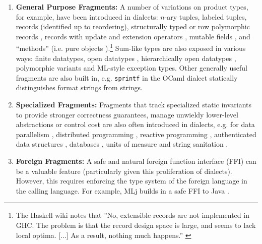 \documentclass{llncs}
\begin{document}
\begin{enumerate}
\item 
\textbf{General Purpose Fragments:} 
A number of variations on product types, for example, have been introduced in dialects: 
$n$-ary tuples, 
labeled tuples, 
records (identified up to reordering), 
structurally typed or row polymorphic records \cite{Cardelli:1984:SMI:1096.1098}, 
records with update and extension operators \cite{ocaml-manual}, 
mutable fields \cite{ocaml-manual}, 
and 
``methods'' (i.e. pure objects \cite{TSLs}).\footnote{The Haskell wiki notes that ''No, extensible records are not implemented in GHC. The problem is that the record design space is large, and seems to lack local optima. [...] As a result, nothing much happens.'' \cite{GHCFAQ}} 
 Sum-like types are also exposed in various ways: 
finite datatypes, 
open datatypes \cite{conf/ppdp/LohH06}, 
hierarchically open datatypes \cite{journals/toplas/MillsteinBC04}, 
polymorphic variants \cite{ocaml-manual} and 
ML-style exception types. Other generally useful fragments are also built in, e.g. \verb|sprintf| in the OCaml dialect statically distinguishes format strings from strings.

\item
\textbf{Specialized Fragments:} Fragments that track specialized static invariants to provide stronger correctness guarantees, manage unwieldy lower-level abstractions or control cost are also often introduced in dialects, e.g. for data parallelism  \cite{chakravarty2007data}, distributed programming \cite{Murphy:2007:TDP:1793574.1793585}, reactive programming \cite{mandel2005reactiveml}, authenticated data structures \cite{Miller:2014:ADS:2535838.2535851}, databases \cite{Ohori:2011:MSM:2034773.2034815},  units of measure \cite{conf/cefp/Kennedy09} and string sanitation \cite{sanitation-psp14}.%

\item
\textbf{Foreign Fragments:} A safe and natural foreign function interface (FFI) can be a valuable feature (particularly given this proliferation of dialects). However, this requires enforcing the type system of the foreign language in the calling language. %
For example, MLj builds in a safe FFI to Java \cite{Benton:1999:IWW:317636.317791}.
\end{enumerate}
\vspace{-5px}
\end{document}
